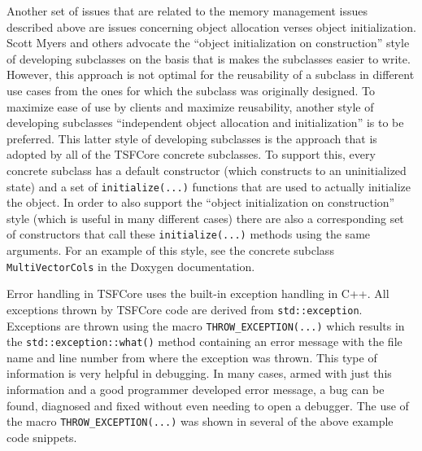 \documentclass[10pt,fleqn]{article}
\begin{document}
Another set of issues that are related to the memory management issues
described above are issues concerning object allocation verses object
initialization.  Scott Myers \cite{ref:meyers_1996} and others
advocate the ``object initialization on construction'' style of
developing subclasses on the basis that is makes the subclasses easier
to write.  However, this approach is not optimal for the reusability of
a subclass in different use cases from the ones for which the subclass
was originally designed.  To maximize ease of use by clients and
maximize reusability, another style of developing subclasses
``independent object allocation and initialization'' is to be
preferred.  This latter style of developing subclasses is the approach
that is adopted by all of the TSFCore concrete subclasses.  To support
this, every concrete subclass has a default constructor (which
constructs to an uninitialized state) and a set of
\texttt{initialize(...)}  functions that are used to actually
initialize the object.  In order to also support the ``object
initialization on construction'' style (which is useful in many
different cases) there are also a corresponding set of constructors
that call these \texttt{initialize(...)} methods using the same
arguments.  For an example of this style, see the concrete subclass
\texttt{MultiVectorCols} in the Doxygen documentation.

Error handling in TSFCore uses the built-in exception handling in C++.
All exceptions thrown by TSFCore code are derived from
\texttt{std::exception}.  Exceptions are thrown using the macro
\texttt{THROW\_EXCEPTION(...)} which results in the \texttt{std::exception::what()}
method containing an error message with the file name and line number
from where the exception was thrown.  This type of information is very
helpful in debugging.  In many cases, armed with just this information
and a good programmer developed error message, a bug can be found,
diagnosed and fixed without even needing to open a debugger.  The use
of the macro \texttt{THROW\_EXCEPTION(...)} was shown in several of
the above example code snippets.
\end{document}
